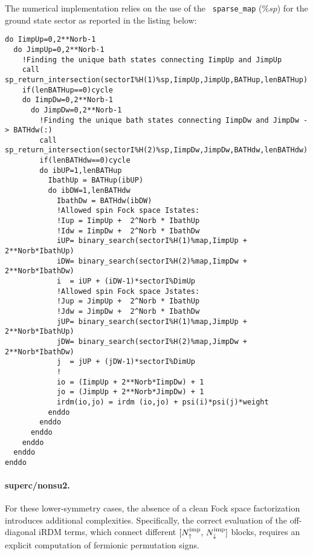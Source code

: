 \documentclass[edipack_sp.tex]{subfiles}
\begin{document}
The numerical implementation relies on the use of the {\tt
  sparse\_map} ($\%sp$) for the ground state sector as reported in the listing below:  
\begin{lstlisting}[style=fstyle,numbers=none,basicstyle={\scriptsize\ttfamily}]
do IimpUp=0,2**Norb-1
  do JimpUp=0,2**Norb-1
    !Finding the unique bath states connecting IimpUp and JimpUp
    call sp_return_intersection(sectorI%H(1)%sp,IimpUp,JimpUp,BATHup,lenBATHup)
    if(lenBATHup==0)cycle
    do IimpDw=0,2**Norb-1
      do JimpDw=0,2**Norb-1
        !Finding the unique bath states connecting IimpDw and JimpDw -> BATHdw(:)
        call sp_return_intersection(sectorI%H(2)%sp,IimpDw,JimpDw,BATHdw,lenBATHdw)
        if(lenBATHdw==0)cycle
        do ibUP=1,lenBATHup
          IbathUp = BATHup(ibUP)
          do ibDW=1,lenBATHdw
            IbathDw = BATHdw(ibDW)
            !Allowed spin Fock space Istates:
            !Iup = IimpUp +  2^Norb * IbathUp
            !Idw = IimpDw +  2^Norb * IbathDw
            iUP= binary_search(sectorI%H(1)%map,IimpUp + 2**Norb*IbathUp)
            iDW= binary_search(sectorI%H(2)%map,IimpDw + 2**Norb*IbathDw)
            i  = iUP + (iDW-1)*sectorI%DimUp
            !Allowed spin Fock space Jstates:
            !Jup = JimpUp +  2^Norb * IbathUp
            !Jdw = JimpDw +  2^Norb * IbathDw
            jUP= binary_search(sectorI%H(1)%map,JimpUp + 2**Norb*IbathUp)
            jDW= binary_search(sectorI%H(2)%map,JimpDw + 2**Norb*IbathDw)
            j  = jUP + (jDW-1)*sectorI%DimUp
            ! 
            io = (IimpUp + 2**Norb*IimpDw) + 1
            jo = (JimpUp + 2**Norb*JimpDw) + 1
            irdm(io,jo) = irdm (io,jo) + psi(i)*psi(j)*weight
          enddo
        enddo
      enddo
    enddo
  enddo
enddo
\end{lstlisting}



\paragraph{{\bf superc/nonsu2}.}
For these lower-symmetry cases, the absence of a clean Fock space 
factorization introduces additional complexities. Specifically, the 
correct evaluation of the off-diagonal iRDM terms, which connect 
different $[N^\mathrm{imp}_\uparrow,\,N^\mathrm{imp}_\downarrow]$ blocks, 
requires an explicit computation of fermionic permutation signs.
\end{document}

